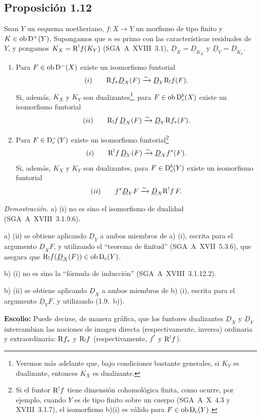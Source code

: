\subsection*{Proposición 1.12}
Sean $Y$ un esquema noetheriano, $f : X \to Y$ un morfismo de tipo finito y $K \in \operatorname{ob} \mathrm{D}^{+}(Y)$. Supongamos que $n$ es primo con las características residuales de $Y$, y pongamos $K_X = \mathrm{R}^{!}f(K_Y)$ (SGA~A~XVIII~3.1), $\underline{D}_X = \underline{D}_{K_X}$ y $\underline{D}_Y = \underline{D}_{K_Y}$.
\begin{enumerate}
\item[a)] Para $F \in \operatorname{ob} \mathrm{D}^{-}(X)$ existe un isomorfismo funtorial
\[
(i) \qquad \mathrm{R} f_{*} \underline{D}_X(F) \xrightarrow{\sim} \underline{D}_Y \mathrm{R}_{!}f(F).
\]
Si, además, $K_X$ y $K_Y$ son dualizantes\footnote{Veremos más adelante que, bajo condiciones bastante generales, si $K_Y$ es dualizante, entonces $K_X$ es dualizante.}, para $F \in \operatorname{ob} \mathrm{D}_c^{b}(X)$ existe un isomorfismo funtorial
\[
(ii) \qquad \mathrm{R}_{!}f \, \underline{D}_X(F) \xrightarrow{\sim} \underline{D}_Y \mathrm{R} f_{*}(F).
\]
\item[b)] Para $F \in \mathrm{D}_c^{-}(Y)$ existe un isomorfismo funtorial\footnote{Si el funtor $\mathrm{R}^{!}f$ tiene dimensión cohomológica finita, como ocurre, por ejemplo, cuando $Y$ es de tipo finito sobre un cuerpo (SGA~A~X~4.3 y XVIII~3.1.7), el isomorfismo b)(i) es válido para $F \in \operatorname{ob} \mathrm{D}_c(Y)$.}
\[
(i) \qquad \mathrm{R}^{!}f \, \underline{D}_Y(F) \xrightarrow{\sim} \underline{D}_X f^{*}(F).
\]
Si, además, $K_X$ y $K_Y$ son dualizantes\footnotemark[3], para $F \in \mathrm{D}_c^{b}(Y)$ existe un isomorfismo funtorial
\[
(ii) \qquad f^{*} \underline{D}_Y F \xrightarrow{\sim} \underline{D}_X \mathrm{R}^{!}f \, F.
\]
\end{enumerate}

\emph{Demostración.} a) (i) no es sino el isomorfismo de dualidad (SGA~A~XVIII~3.1.9.6).

a) (ii) se obtiene aplicando $\underline{D}_Y$ a ambos miembros de a) (i), escrita para el argumento $\underline{D}_X F$, y utilizando el \textquotedblleft teorema de finitud\textquotedblright{} (SGA~A~XVII~5.3.6), que asegura que $\mathrm{R}_{!}f(\underline{D}_X(F)) \in \operatorname{ob} \mathrm{D}_c(Y)$.

b) (i) no es sino la \textquotedblleft fórmula de inducción\textquotedblright{} (SGA~A~XVIII~3.1.12.2).

b) (ii) se obtiene aplicando $\underline{D}_X$ a ambos miembros de b) (i), escrita para el argumento $\underline{D}_Y F$, y utilizando (1.9.~b)).

\textbf{Escolio:} Puede decirse, de manera gráfica, que los funtores dualizantes $\underline{D}_X$ y $\underline{D}_Y$ intercambian las nociones de imagen directa (respectivamente, inversa) ordinaria y extraordinaria: $\mathrm{R} f_{*}$ y $\mathrm{R}_{!}f$ (respectivamente, $f^{*}$ y $\mathrm{R}^{!}f$).
